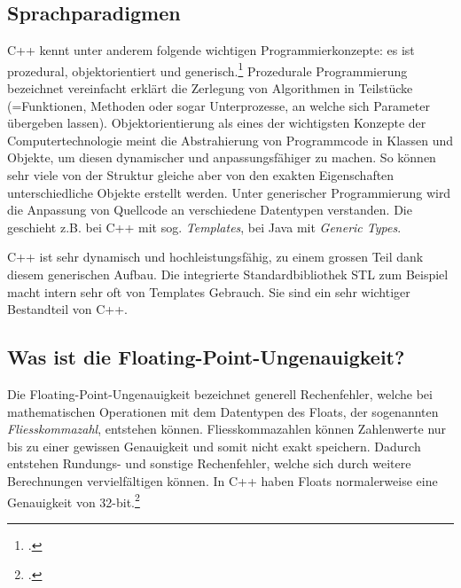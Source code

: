 \documentclass[titlepage, 11pt, a4paper, ngerman]{article}
\begin{document}
\subsection{Sprachparadigmen}
C++ kennt unter anderem folgende wichtigen Programmierkonzepte: es ist prozedural, objektorientiert und generisch.\footcite{cppparadigms} Prozedurale Programmierung bezeichnet vereinfacht erklärt die Zerlegung von Algorithmen in Teilstücke (=Funktionen, Methoden oder sogar Unterprozesse, an welche sich Parameter übergeben lassen). Objektorientierung als eines der wichtigsten Konzepte der Computertechnologie meint die Abstrahierung von Programmcode in Klassen und Objekte, um diesen dynamischer und anpassungsfähiger zu machen. So können sehr viele von der Struktur gleiche aber von den exakten Eigenschaften unterschiedliche Objekte erstellt werden. Unter generischer Programmierung wird die Anpassung von Quellcode an verschiedene Datentypen verstanden. Die geschieht z.B. bei C++ mit sog. \textit{Templates}, bei Java mit \textit{Generic Types}.\par
C++ ist sehr dynamisch und hochleistungsfähig, zu einem grossen Teil dank diesem generischen Aufbau. Die integrierte Standardbibliothek STL zum Beispiel macht intern sehr oft von Templates Gebrauch. Sie sind ein sehr wichtiger Bestandteil von C++.

\subsection{Was ist die Floating-Point-Ungenauigkeit?}
Die \gls{Floating-Point}-Ungenauigkeit bezeichnet generell Rechenfehler, welche bei mathematischen Operationen mit dem Datentypen des \gls{Float}s, der sogenannten \textit{\gls{Fliesskommazahl}}, entstehen können. \gls{Fliesskommazahl}en können Zahlenwerte nur bis zu einer gewissen Genauigkeit und somit nicht exakt speichern. Dadurch entstehen Rundungs- und sonstige Rechenfehler, welche sich durch weitere Berechnungen vervielfältigen können. In C++ haben \glspl{Float} normalerweise eine Genauigkeit von 32-bit.\footcite{float-prec}
\end{document}
